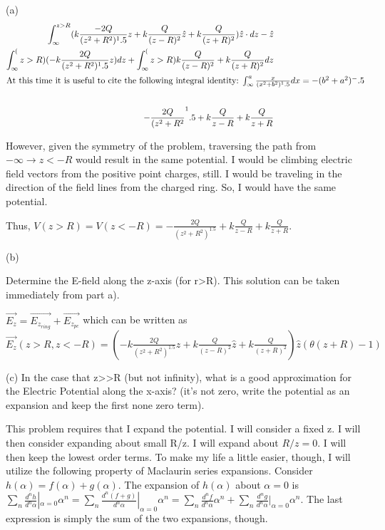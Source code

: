 \begin{homeworkProblem}
\begin{homeworkSection}{(a)}
\begin{align}
\int_\infty^{z>R} (k \frac{-2Q}{(z^2+R^2)^1.5}z + k \frac{Q}{(z-R)^2}\hat{z} + k \frac{Q}{(z+R)^2} ) \hat{z} \cdot dz -\hat{z} \nonumber \\
\int_\infty^(z>R)  (-k \frac{2Q}{(z^2+R^2)^1.5}z) dz + \int_\infty^(z>R) k \frac{Q}{(z-R)^2} + k \frac{Q}{(z+R)^2} dz \nonumber \\
\intertext{At this time it is useful to cite the following integral identity: $\int_\infty^a \frac{x}{(x^2+b^2)^1.5}dx = -(b^2+a^2)^-.5$} \nonumber \\
-\frac{2Q}{(z^2+R^2}^1.5 + k\frac{Q}{z-R} + k\frac{Q}{z+R} \nonumber
\end{align}

However, given the symmetry of the problem, traversing the path from $-\infty \rightarrow z < -R$ would result in the same potential. I would be climbing electric field vectors from the positive point charges, still. I would be traveling in the direction of the field lines from the charged ring. So, I would have the same potential.

Thus, $V(z>R) = V(z<-R) = -\frac{2Q}{(z^2+R^2)^1.5} + k\frac{Q}{z-R} + k\frac{Q}{z+R}$.


\end{homeworkSection}

\begin{homeworkSection}{(b)}

Determine the E-field along the z-axis (for r>R). This solution can be taken immediately from part a). 

 $\vec{E_z} = \vec{E_{z_{ring}}} + \vec{E_{z_{pc}}}$ which can be written as $\vec{E_z}(z>R,z<-R) = (-k \frac{2Q}{(z^2+R^2)^1.5}z + k \frac{Q}{(z-R)^2}\hat{z} + k \frac{Q}{(z+R)^2} ) \hat{z} (\theta(z+R)-1)$

\end{homeworkSection}

\begin{homeworkSection}{(c)}
In the case that z>>R (but not infinity), what is a good approximation for the Electric 
Potential along the x-axis? (it's not zero, write the potential as an expansion and keep 
the first none zero term). 

This problem requires that I expand the potential. I will consider a fixed z. I will then consider expanding about small R/z. I will expand about $R/z = 0$. I will then keep the lowest order terms. To make my life a little easier, though, I will utilize the following property of Maclaurin series expansions. Consider $h(\alpha) = f(\alpha) + g(\alpha)$. The expansion of $h(\alpha)$ about $\alpha = 0$ is $\sum_n \frac{d^n h}{d^n \alpha}|_{\alpha = 0} \alpha^n = \sum_n \frac{d^n (f+g)}{d^n \alpha}|_{\alpha = 0} \alpha^n = \sum_n \frac{d^n f}{d^n \alpha} \alpha^n + \sum_n \frac{d^n g}{d^n \alpha}|_{\alpha = 0} \alpha^n$. The last expression is simply the sum of the two expansions, though.


\end{homeworkSection}
\end{homeworkProblem}
